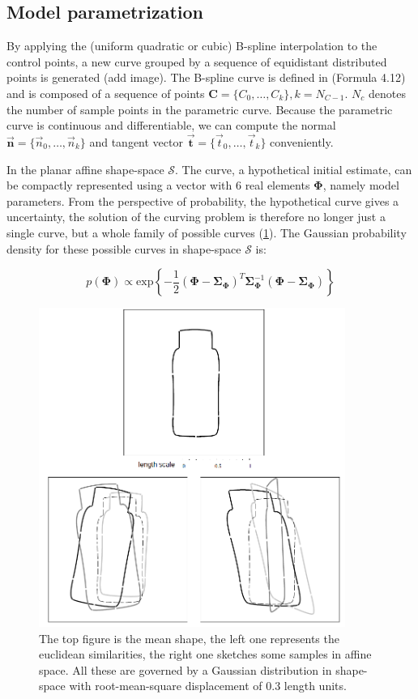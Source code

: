 \subsection{Model parametrization}
\label{sec:mp}

By applying the (uniform quadratic or cubic) B-spline interpolation to the control points, a new curve
grouped by a sequence of equidistant distributed points is generated
(add image). The B-spline curve is defined in (Formula 4.12) and is
composed of a sequence of points $\mathbf{C} = \{C_0, \ldots,
C_{k}\}, k = N_{C-1}$. $N_c$ denotes the number of sample points in the
parametric curve. Because the parametric curve is continuous and
differentiable, we can compute the normal $\vec{\mathbf{n}} = \{\vec{n}_0, \ldots,
\vec{n}_{k}\}$ and tangent vector $\vec{\mathbf{t}} = \{\vec{t}_0, \ldots, \vec{t}_{k}\}$
conveniently. 

In the planar affine shape-space $\mathcal{S}$. The curve, a
hypothetical initial estimate, can be compactly represented using a
vector with 6 real elements $\mathbf{\Phi}$, namely model
parameters. From the perspective of probability, the hypothetical
curve gives a uncertainty, the solution of the curving problem is
therefore no longer just a single curve, but a whole family of
possible curves (\ref{fig:prior}). The Gaussian probability density for these possible
curves in shape-space $\mathcal{S}$ is:

\begin{equation}
  \label{eq:prior}
   p(\mathbf{\Phi}) \propto
\mathrm{exp} \left\{ -\frac{1}{2} (\mathbf{\Phi} -
  \mathbf{\Sigma}_{\mathbf{\Phi}})^T \mathbf{\Sigma}_{\mathbf{\Phi}}^{-1} (\mathbf{\Phi} -
  \mathbf{\Sigma}_{\mathbf{\Phi}}) \right\}
\end{equation}

\begin{figure}[htb]
  \centering
  \includegraphics[width=10cm]{images/prior.png}
\caption[Sampling from curve families~\cite{blake1998active}]{The top
  figure is the mean shape, the left one represents the euclidean
  similarities, the right one
  sketches some samples in affine space. All these are governed by a
  Gaussian distribution in shape-space with root-mean-square
  displacement of 0.3 length units.}
\label{fig:prior}
\end{figure}

